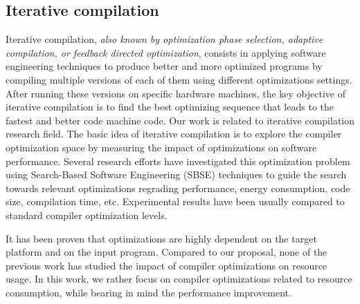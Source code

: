 \subsection{Iterative compilation}
Iterative compilation, \textit{also known by optimization phase selection, adaptive compilation, or feedback directed optimization}, consists in applying software engineering techniques to produce better and more optimized programs by compiling multiple versions of each of them using different optimizations settings. After running these versions on specific hardware machines, the key objective of iterative compilation is to find the best optimizing sequence that leads to the fastest and better code machine code. 
Our work is related to iterative compilation research field.
The basic idea of iterative compilation is to explore the compiler optimization space by measuring the impact of optimizations on software performance.
Several research efforts have investigated this optimization problem using Search-Based Software Engineering (SBSE) techniques to guide the search towards relevant optimizations regrading performance, energy consumption, code size, compilation time, etc. Experimental results have been usually compared to standard compiler optimization levels.  

It has been proven that optimizations are highly dependent on the target platform and on the input program. 
Compared to our proposal, none of the previous work has studied the impact of compiler optimizations on resource usage. In this work, we rather focus on compiler optimizations related to resource consumption, while bearing in mind the performance improvement.

